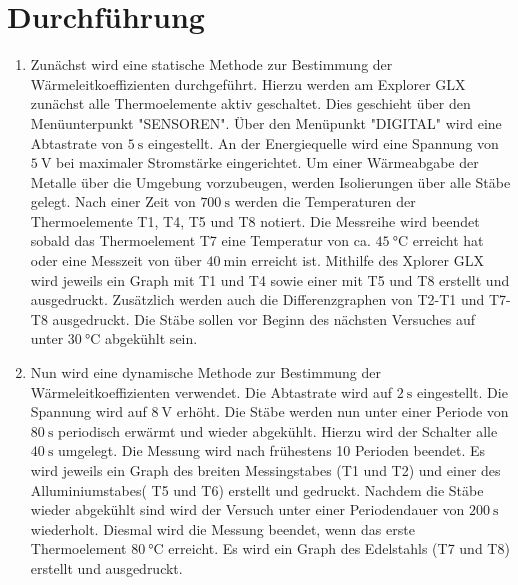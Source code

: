 
\section{Durchführung}
\label{sec:Durchführung}

\renewcommand{\labelenumi}{\alph{enumi})}
\begin{enumerate}
  \item Zunächst wird eine statische Methode zur Bestimmung der Wärmeleitkoeffizienten
  durchgeführt. Hierzu werden am Explorer GLX zunächst alle Thermoelemente aktiv geschaltet.
  Dies geschieht über den Menüunterpunkt "SENSOREN". Über den Menüpunkt "DIGITAL"
   wird eine Abtastrate von $\SI{5}{\second}$ eingestellt. An der Energiequelle wird
    eine Spannung von $\SI{5}{\volt}$ bei maximaler Stromstärke eingerichtet. Um
     einer Wärmeabgabe der Metalle über die Umgebung vorzubeugen, werden
     Isolierungen über alle Stäbe gelegt. Nach einer Zeit von $\SI{700}{\second}$
     werden die Temperaturen der Thermoelemente T1, T4, T5 und T8 notiert. Die Messreihe
      wird beendet sobald das Thermoelement T7 eine Temperatur von ca.
       $\SI{45}{\degreeCelsius}$ erreicht hat oder eine Messzeit von über
       $\SI{40}{\minute}$ erreicht ist. Mithilfe des Xplorer GLX wird jeweils
       ein Graph mit T1 und T4 sowie einer mit T5 und T8 erstellt und ausgedruckt.
       Zusätzlich werden auch die Differenzgraphen von T2-T1 und T7-T8 ausgedruckt.
       Die Stäbe sollen vor Beginn des nächsten Versuches auf unter $\SI{30}{\degreeCelsius}$ abgekühlt sein.


       \item Nun wird eine dynamische Methode zur Bestimmung der Wärmeleitkoeffizienten verwendet.
       Die Abtastrate wird auf $\SI{2}{\second}$ eingestellt. Die Spannung wird
       auf $\SI{8}{\volt}$ erhöht. Die Stäbe werden nun unter einer Periode von $\SI{80}{\second}$
        periodisch erwärmt und wieder abgekühlt. Hierzu wird der Schalter alle
        $\SI{40}{\second}$ umgelegt. Die Messung wird nach frühestens 10 Perioden
        beendet. Es wird jeweils ein Graph des breiten Messingstabes (T1 und T2)
        und einer des Alluminiumstabes( T5 und T6) erstellt und gedruckt.
        Nachdem die Stäbe wieder abgekühlt sind wird der Versuch unter einer
        Periodendauer von $\SI{200}{\second}$ wiederholt. Diesmal wird die Messung
         beendet, wenn das erste Thermoelement $\SI{80}{\degreeCelsius}$ erreicht.
         Es wird ein Graph des Edelstahls (T7 und T8) erstellt und ausgedruckt.

\end{enumerate}
